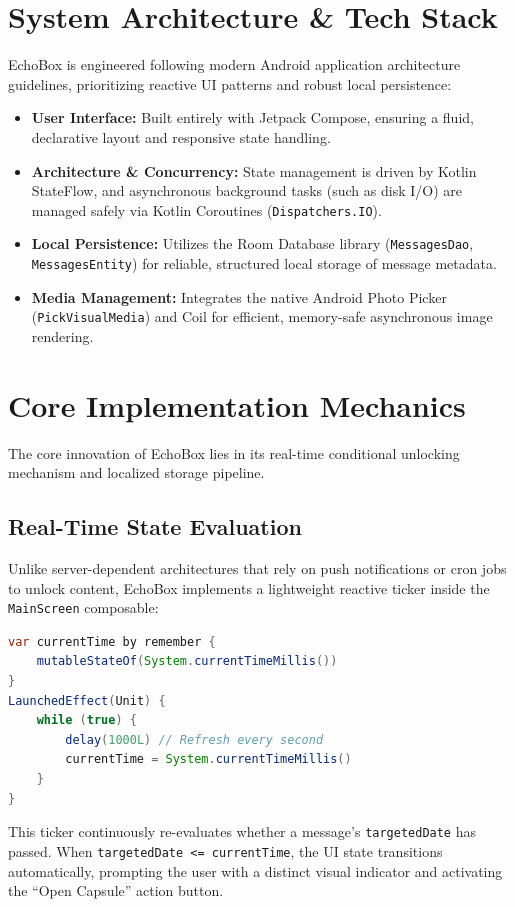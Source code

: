 \documentclass[manuscript,screen]{acmart}
\begin{document}
\section{System Architecture \& Tech Stack}
EchoBox is engineered following modern Android application architecture guidelines, prioritizing reactive UI patterns and robust local persistence:
\begin{itemize}
    \item \textbf{User Interface:} Built entirely with Jetpack Compose, ensuring a fluid, declarative layout and responsive state handling.
    \item \textbf{Architecture \& Concurrency:} State management is driven by Kotlin StateFlow, and asynchronous background tasks (such as disk I/O) are managed safely via Kotlin Coroutines (\texttt{Dispatchers.IO}).
    \item \textbf{Local Persistence:} Utilizes the Room Database library (\texttt{MessagesDao}, \texttt{MessagesEntity}) for reliable, structured local storage of message metadata.
    \item \textbf{Media Management:} Integrates the native Android Photo Picker (\texttt{PickVisualMedia}) and Coil for efficient, memory-safe asynchronous image rendering.
\end{itemize}

\section{Core Implementation Mechanics}
The core innovation of EchoBox lies in its real-time conditional unlocking mechanism and localized storage pipeline.

\subsection{Real-Time State Evaluation}
Unlike server-dependent architectures that rely on push notifications or cron jobs to unlock content, EchoBox implements a lightweight reactive ticker inside the \texttt{MainScreen} composable:

\begin{lstlisting}[language=Java]
var currentTime by remember {
    mutableStateOf(System.currentTimeMillis())
}
LaunchedEffect(Unit) {
    while (true) {
        delay(1000L) // Refresh every second
        currentTime = System.currentTimeMillis()
    }
}
\end{lstlisting}

This ticker continuously re-evaluates whether a message's \texttt{targetedDate} has passed. When \texttt{targetedDate <= currentTime}, the UI state transitions automatically, prompting the user with a distinct visual indicator and activating the ``Open Capsule'' action button.
\end{document}
